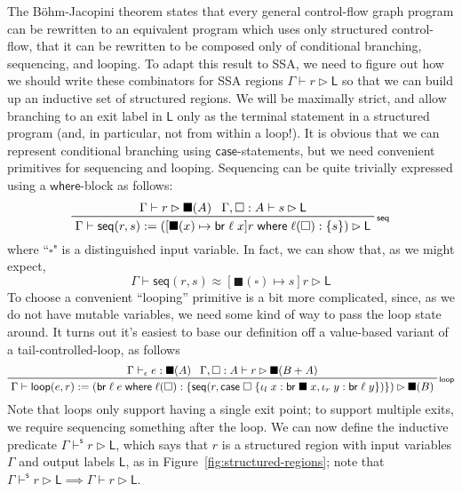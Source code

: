 \documentclass[acmsmall,screen,review]{acmart}
\newcommand{\ms}[1]{\ensuremath{\mathsf{#1}}}
\newcommand{\lto}{:}
\newcommand{\linl}[1]{\iota_l\;{#1}}
\newcommand{\linr}[1]{\iota_r\;{#1}}
\newcommand{\brb}[2]{\ms{br}\;#1\;#2}
\newcommand{\casestmt}[5]{\ms{case}\;#1\;\{\linl{#2} \lto #3, \linr{#4} \lto #5\}}
\newcommand{\where}[2]{#1\;\ms{where}\;#2}
\newcommand{\wbranch}[3]{#1(#2) \lto \{#3\}}
\newcommand{\bhyp}[2]{#1 : #2}
\newcommand{\rle}[1]{{\scriptsize\textsf{#1}}}
\newcommand{\hasty}[4]{#1 \vdash_{#2} #3: {#4}}
\newcommand{\haslb}[3]{#1 \vdash #2 \rhd #3}
\newcommand{\shaslb}[3]{#1 \vdash^{\ms{s}} #2 \rhd #3}
\newcommand{\teqv}{\approx}
\newcommand{\lbeq}[4]{#1 \vdash #2 \teqv #3 \rhd {#4}}
\newcommand{\invar}{\square}
\newcommand{\outlb}{\blacksquare}
\begin{document}
The B\"ohm-Jacopini theorem states that every general control-flow graph program can be rewritten to
an equivalent program which uses only structured control-flow, that it can be rewritten to be
composed only of conditional branching, sequencing, and looping. To adapt this result to SSA, we
need to figure out how we should write these combinators for SSA regions $\haslb{\Gamma}{r}{\ms{L}}$
so that we can build up an inductive set of structured regions. We will be maximally strict, and
allow branching to an exit label in $\ms{L}$ only as the terminal statement in a structured program
(and, in particular, not from within a loop!). It is obvious that we can represent conditional
branching using \ms{case}-statements, but we need convenient primitives for sequencing and looping.
Sequencing can be quite trivially expressed using a \ms{where}-block as follows:
\begin{equation}
  \prftree[r]{\rle{seq}}
    {\haslb{\Gamma}{r}{\outlb(A)}}
    {\haslb{\Gamma, \bhyp{\invar}{A}}{s}{\ms{L}}}
    {\haslb{\Gamma}{\ms{seq}(r, s) 
      := (\where{[\outlb(x) \mapsto \brb{\ell}{x}]r}{\wbranch{\ell}{\invar}{s}})}{\ms{L}}}
\end{equation}
where ``$\invar$" is a distinguished input variable. In fact, we can show that, as we might expect,
\begin{equation}
  \lbeq{\Gamma}{\ms{seq}(r, s)}{[\outlb(\invar) \mapsto s]r}{\ms{L}}
\end{equation}
To choose a convenient ``looping'' primitive is a bit more complicated, since, as we do not have
mutable variables, we need some kind of way to pass the loop state around. It turns out it's easiest
to base our definition off a value-based variant of a tail-controlled-loop, as follows
\begin{equation}
  \prftree[r]{\rle{loop}}
    {\hasty{\Gamma}{\epsilon}{e}{\outlb(A)}}
    {\haslb{\Gamma, \bhyp{\invar}{A}}{r}{\outlb(B + A)}}
    {\haslb{\Gamma}{\ms{loop}(e, r) 
      := (\where{\brb{\ell}{e}}{\wbranch{\ell}{\invar}
        {\ms{seq}(r, \casestmt{\invar}{x}{\brb{\outlb}{x}}{y}{\brb{\ell}{y}})}})}{\outlb(B)}}
\end{equation}
Note that loops only support having a single exit point; to support multiple exits, we require
sequencing something after the loop. We can now define the inductive predicate
$\shaslb{\Gamma}{r}{\ms{L}}$, which says that $r$ is a structured region with input variables
$\Gamma$ and output labels $\ms{L}$, as in Figure~\ref{fig:structured-regions}; note that
$\shaslb{\Gamma}{r}{\ms{L}} \implies \haslb{\Gamma}{r}{\ms{L}}$. 
\end{document}

